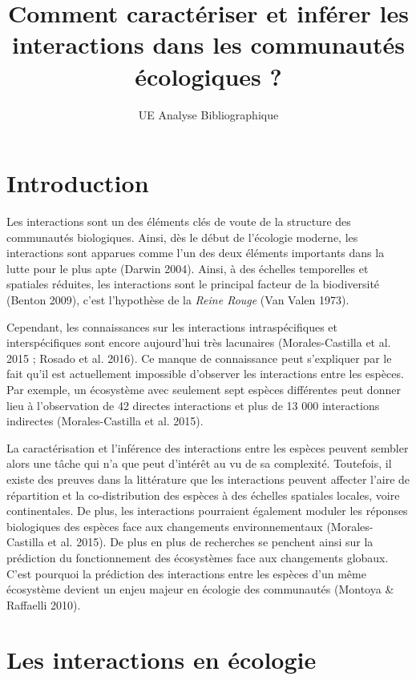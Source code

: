 \documentclass[
  12pt,
  a4paper,
  oneside]{report}
\title{Comment caractériser et inférer les interactions dans les communautés
écologiques ?}
\subtitle{UE Analyse Bibliographique}
\date{}
\begin{document}
\maketitle

{
\setcounter{tocdepth}{2}
\tableofcontents
}
\hypertarget{introduction}{%
\chapter{Introduction}\label{introduction}}

Les interactions sont un des éléments clés de voute de la structure des
communautés biologiques. Ainsi, dès le début de l'écologie moderne, les
interactions sont apparues comme l'un des deux éléments importants dans
la lutte pour le plus apte (Darwin 2004). Ainsi, à des échelles
temporelles et spatiales réduites, les interactions sont le principal
facteur de la biodiversité (Benton 2009), c'est l'hypothèse de la
\emph{Reine Rouge} (Van Valen 1973).

Cependant, les connaissances sur les interactions intraspécifiques et
interspécifiques sont encore aujourd'hui très lacunaires
(Morales-Castilla et al. 2015 ; Rosado et al. 2016). Ce manque de
connaissance peut s'expliquer par le fait qu'il est actuellement
impossible d'observer les interactions entre les espèces. Par exemple,
un écosystème avec seulement sept espèces différentes peut donner lieu à
l'observation de 42 directes interactions et plus de 13 000 interactions
indirectes (Morales-Castilla et al. 2015).

La caractérisation et l'inférence des interactions entre les espèces
peuvent sembler alors une tâche qui n'a que peut d'intérêt au vu de sa
complexité. Toutefois, il existe des preuves dans la littérature que les
interactions peuvent affecter l'aire de répartition et la
co-distribution des espèces à des échelles spatiales locales, voire
continentales. De plus, les interactions pourraient également moduler
les réponses biologiques des espèces face aux changements
environnementaux (Morales-Castilla et al. 2015). De plus en plus de
recherches se penchent ainsi sur la prédiction du fonctionnement des
écosystèmes face aux changements globaux. C'est pourquoi la prédiction
des interactions entre les espèces d'un même écosystème devient un enjeu
majeur en écologie des communautés (Montoya \& Raffaelli 2010).

\hypertarget{les-interactions-en-uxe9cologie}{%
\chapter{Les interactions en
écologie}\label{les-interactions-en-uxe9cologie}}
\end{document}
